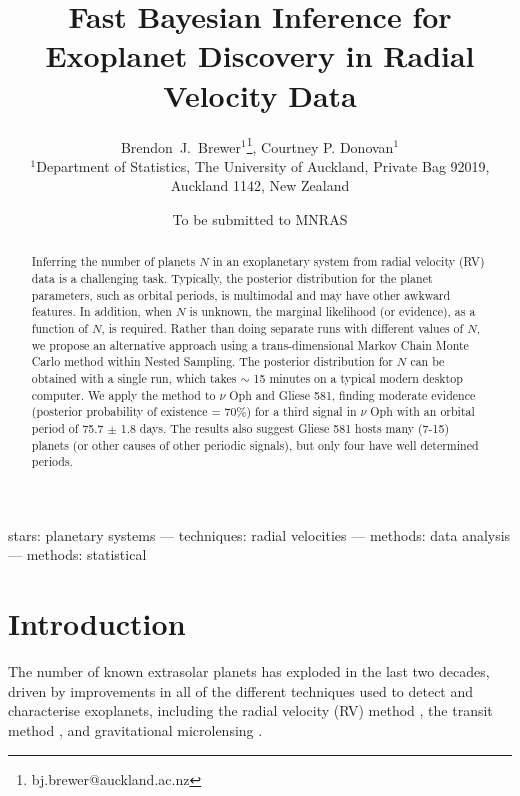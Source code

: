 \documentclass[useAMS,usenatbib]{mn2e}
\title[]
{Fast Bayesian Inference for Exoplanet Discovery in Radial Velocity Data}
\author[Brewer]{%
  Brendon~J.~Brewer$^{1}$\thanks{bj.brewer@auckland.ac.nz},
  Courtney P. Donovan$^{1}$
  \medskip\\
  $^1$Department of Statistics, The University of Auckland, Private Bag 92019, Auckland 1142, New Zealand}
\begin{document}
             
\date{To be submitted to MNRAS}
             
\maketitle

\label{firstpage}


\begin{abstract}
Inferring the number of planets $N$ in an exoplanetary system from radial velocity
(RV) data is a challenging task. Typically, the posterior distribution for the
planet parameters, such as orbital periods,
is multimodal and may have other awkward features. In
addition, when $N$ is unknown, the marginal likelihood (or evidence), as a
function of $N$, is required. Rather than doing separate runs with different
values of $N$, we propose an alternative
approach using a trans-dimensional Markov Chain Monte Carlo method within
Nested Sampling. The posterior distribution for $N$ can be obtained with a
single run, which takes $\sim$ 15 minutes on a typical modern desktop computer.
We apply the method to $\nu$ Oph and Gliese 581, finding moderate evidence
(posterior probability of existence = 70\%) for a third signal in
$\nu$ Oph with an orbital period of 75.7 $\pm$ 1.8 days. The results also
suggest Gliese 581 hosts many (7-15) planets (or other causes of other periodic
signals), but only four have well determined periods. 
\end{abstract}

\begin{keywords}
stars: planetary systems --- techniques: radial velocities ---
methods: data analysis --- methods: statistical
\end{keywords}


\section{Introduction}
The number of known extrasolar planets has exploded in the last two
decades, driven by improvements in
all of the different techniques used to detect and characterise exoplanets,
including the radial velocity (RV) method \citep[e.g.][]{},
the transit method \citep[e.g.]{2014PNAS..11112647B},
and gravitational microlensing
\citep[e.g.][]{2014ApJ...785..155B, 2014ApJ...790...14Y}.
\end{document}
